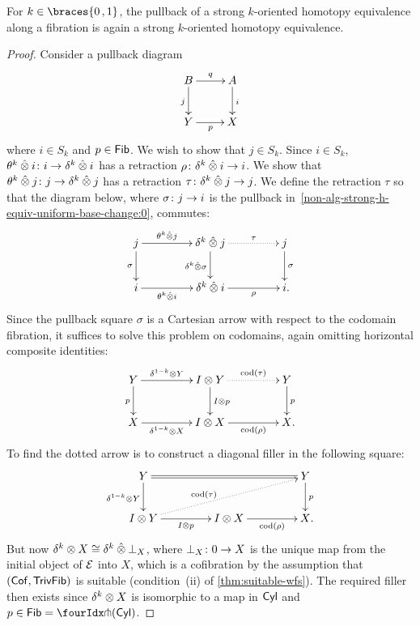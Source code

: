 \documentclass[reqno,10pt,a4paper,oneside,draft]{amsart}
\begin{document}
{{\begin{lemma} 
\label{thm:non-alg-frobenius-she}
For $k \in \braces{0 \, , 1}$, the pullback of a strong $k$-oriented homotopy equivalence along a fibration is again a strong $k$-oriented 
homotopy equivalence.
\end{lemma} 

\begin{proof} Consider a pullback diagram
\begin{equation}
\label{non-alg-strong-h-equiv-uniform-base-change:0}
\begin{gathered}
\xymatrix{
 B \ar[d]_j \ar[r]^q & A \ar[d]^i \\ 
Y \ar[r]_p & X }
\end{gathered}
\end{equation}
where $i  \in S_k$ and $p \in \mathsf{Fib}$. We wish to show that $j \in  S_k$. Since $i \in S_k$, $\theta^k \mathbin{\hat{\otimes}} i \colon i \to \delta^k \mathbin{\hat{\otimes}} i$ has a retraction $\rho \colon \delta^k \mathbin{\hat{\otimes}} i \to i$.  We show that $\theta^k \mathbin{\hat{\otimes}} j \colon j \to \delta^k \mathbin{\hat{\otimes}} j$ has a retraction 
$\tau \colon  \delta^k \mathbin{\hat{\otimes}} j \to j$. We define the retraction $\tau$ so that the diagram below, where $\sigma \colon j \to i$ is 
the pullback in~\eqref{non-alg-strong-h-equiv-uniform-base-change:0}, commutes:
\[
\xymatrix@C+2em{
j 
  \ar[r]^-{\thetak \hatotimes j}
  \ar[d]_{\sigma}
&
  \kcyl \hatotimes j 
  \ar@{.>}[r]^-{\tau}
  \ar[d]_{\kcyl \hatotimes \sigma}
&
 j 
  \ar[d]^{\sigma}
\\
  i
  \ar[r]_-{\thetak \hatotimes i}
&
  \kcyl \hatotimes i
  \ar[r]_-{\rho}
&
  i
\rlap{.}}
\]
Since the pullback square $\sigma$ is a Cartesian arrow with respect to the codomain fibration, it suffices to solve this problem on codomains, again omitting horizontal composite identities:
\[
\xymatrix@C+2em{
  Y
  \ar[r]^-{\kcylinv \otimes Y}
  \ar[d]_{p}
&
  \interval \otimes Y
  \ar@{.>}[r]^-{\cod(\tau)}
  \ar[d]^{\interval \otimes p}
&
  Y
  \ar[d]^{p}
\\
  X
  \ar[r]_-{\kcylinv \otimes X}
&
  \interval \otimes X
  \ar[r]_-{\cod(\rho)}
&
  X
\rlap{.}}
\]
To find the dotted arrow is to construct a diagonal filler in the following square:
\[
\xymatrix@C+2em{
  Y
  \ar@{=}[rr]
  \ar[d]_{\kcylinv \otimes Y}
&&
  Y
  \ar[d]^{p}
\\
  \interval \otimes Y
  \ar[r]_-{I \otimes p}
  \ar@{.>}[urr]^(0.4){\cod(\tau)}
&
  \interval \otimes X
  \ar[r]_-{\cod(\rho)}
&
  X
\rlap{.}}
\]
But now $\delta^k \otimes X \cong 
\delta^k \mathbin{\hat{\otimes}} \bot_X$, where $\bot_X \colon 0 \to X$ is the unique map from the initial object of $\mathcal{E}$ into $X$, which is 
a cofibration by the assumption that $(\mathsf{Cof}, \mathsf{TrivFib})$ is suitable (condition~(ii) of \cref{thm:suitable-wfs}). The required
filler then exists since $\delta^k \otimes X$
is isomorphic to a map in $\mathsf{Cyl}$ and~$p \in \Fib = \liftr{(\Cyl)}$.
\end{proof} 



}}
\end{document}
